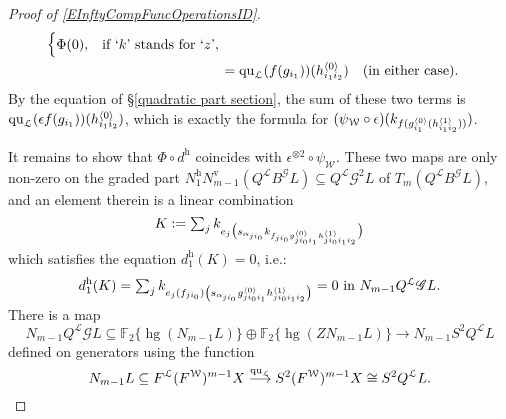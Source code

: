 \documentclass[11pt]{amsart} \renewcommand{\baselinestretch}{1.2}
\theoremstyle{plain}
\theoremstyle{definition}
\DeclareMathOperator{\homog}{hg}
\renewcommand{\to}{\longrightarrow}
\newcommand{\scrG}{\mathscr{G}}
\newcommand{\calL}{\mathcal{L}}
\newcommand{\calw}{\mathcal{W}}
\newcommand{\call}{\mathcal{L}}
\newcommand{\BSW}{{\scrG}}
\newcommand{\BSWres}{B^\BSW}%
\newcommand{\quadratic}{\mathrm{qu}}
\newcommand{\F}{\mathbb{F}}
\newcommand{\Ftwo}{\F_2}
\newcommand{\uver}{^\mathrm{v}}
\newcommand{\uhor}{^\mathrm{h}}
\begin{document}
\begin{Operations in composite functor spectral sequences}
\begin{proof}[Proof of \ref{EInftyCompFuncOperationsID}]
\begin{alignat*}{2}
\begin{cases}
\Phi(0),&\textup{if `$k$' stands for `$z$'},
\end{cases}\\
&={\quadratic_\call}(f(g_{i_1}))(h^{\smash{\langle} 0\smash{\rangle}}_{i_1i_2})\quad\textup{(in either case).}
\end{alignat*}
By the equation of \S\ref{quadratic part section}, the sum of these two terms is ${\quadratic_\call}(\epsilon f(g_{i_1}))(h^{\smash{\langle} 0\smash{\rangle}}_{i_1i_2})$, which is exactly the formula for $(\psi_{\calw}\circ\epsilon)(k_{f\relax (g^{\smash{\langle} 0\smash{\rangle}}_{i_1}(h^{\smash{\langle} 1\smash{\rangle}}_{i_1i_2}))})$.

It remains to show that $\Phi\circ d\uhor$ coincides with $\epsilon^{\otimes 2}\circ\psi_{\calw}$. These two maps are only non-zero on the graded part $N\uhor_1N\uver_{m-1}(Q^{\call}\BSWres L)\subseteq Q^{\calL}\BSW^2 L$ of  $T_{m}(Q^{\calL}\BSWres L)$, and an element therein is a linear combination
\[K:=\textstyle\sum_j k_{e_j\bigl(\smash{s_{\alpha_{ji_0}} k_{f\relax _{ji_0}g^{\smash{\langle} 0\smash{\rangle}}_{ji_0i_1}h^{\smash{\langle} 1\smash{\rangle}}_{ji_0i_1i_2}}}\bigr)}\]
which satisfies the equation $d\uhor_1(K)=0$, i.e.:
\[d\uhor_1(K)=\textstyle\sum_j \smash{k_{e_j(f_{ji_0})\left(s_{\alpha_{ji_0}} {g^{\smash{\langle} 0\smash{\rangle}}_{ji_0i_1}h^{\smash{\langle} 1\smash{\rangle}}_{ji_0i_1i_2}}\right)}}=0\textup{ in }N_{m-1}Q^{\calL}\BSW L.\]
%
%
There is a map 
\[N_{m-1}Q^{\calL}\BSW L \subseteq \Ftwo \{\homog( N_{m-1}L)\} \oplus \Ftwo \{\homog( ZN_{m-1}L)\}\to N_{m-1}S^2Q^{\calL}L\]
defined on generators using the function
\[N_{m-1}L\subseteq F^{\calL}(F^{\calw})^{m-1}X \smash{{}\overset{\quadratic_\call}{\to}{}}S^2(F^{\calw})^{m-1}X\cong S^2Q^{\calL}L.\]

\end{proof}
\end{Operations in composite functor spectral sequences}
\end{document}
